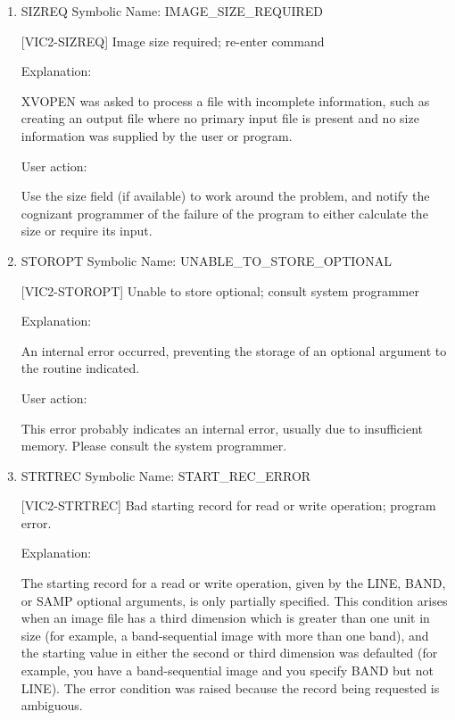 \begin{enumerate}
 Unable to free array file, consult system programmer

Explanation:

The area of memory allocated for an array file, called
a mapped section, cannot be deleted.

User action:

This is a system error.  Consult the cognizant programmer
for the VICAR executive.


\item SIZREQ Symbolic Name: IMAGE\_SIZE\_REQUIRED

[VIC2-SIZREQ] Image size required; re-enter command

Explanation:

XVOPEN was asked to process a file with incomplete information,
such as creating an output file where no primary input file is
present and no size information was supplied by the user or program.

User action:

Use the size field (if available) to work around the problem, and
notify the cognizant programmer of the failure of the program to
either calculate the size or require its input.


\item STOROPT Symbolic Name: UNABLE\_TO\_STORE\_OPTIONAL

[VIC2-STOROPT] Unable to store optional; consult system programmer

Explanation:

An internal error occurred, preventing the storage
of an optional argument to the routine indicated.

User action:

This error probably indicates an internal error, usually due
to insufficient memory.  Please consult the system programmer.


\item STRTREC Symbolic Name: START\_REC\_ERROR

[VIC2-STRTREC] Bad starting record for read or write operation; program error.

Explanation:

The starting record for a read or write operation, given by the LINE,
BAND, or SAMP optional arguments, is only partially specified.  This
condition arises when an image file has a third dimension which is
greater than one unit in size (for example, a band-sequential image
with more than one band), and the starting value in either the second
or third dimension was defaulted (for example, you have a band-sequential
image and you specify BAND but not LINE).  The error condition was
raised because the record being requested is ambiguous.


\end{enumerate}
